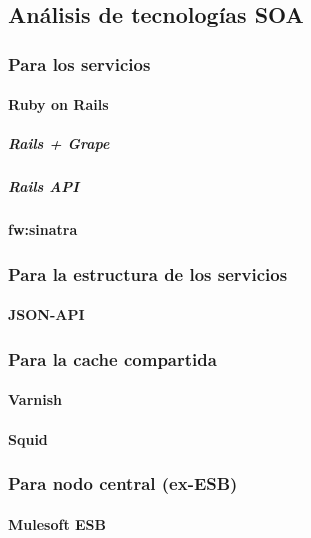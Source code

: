 \subsection{Análisis de tecnologías SOA}
\label{soa:tecnologias}


\subsubsection{Para los servicios}

\paragraph{Ruby on Rails}

\subparagraph{Rails + Grape}
\subparagraph{Rails API}

\paragraph{\gls{fw:sinatra}}


\subsubsection{Para la estructura de los servicios}

\paragraph{JSON-API}


\subsubsection{Para la cache compartida}

\paragraph{Varnish}
\paragraph{Squid}


\subsubsection{Para nodo central (ex-ESB)}

\paragraph{Mulesoft ESB}

